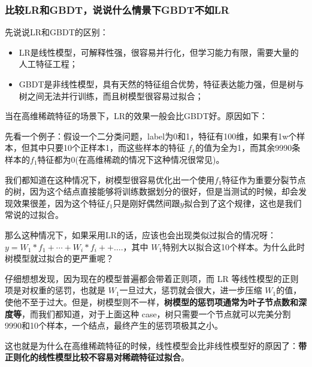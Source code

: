 \documentclass[12pt]{article}
\begin{document}
\subsubsection{比较LR和GBDT，说说什么情景下GBDT不如LR}
先说说LR和GBDT的区别：
\begin{itemize}
\setlength{\itemsep}{0pt}
\setlength{\parsep}{0pt}
\setlength{\parskip}{0pt}
    \item LR是线性模型，可解释性强，很容易并行化，但学习能力有限，需要大量的人工特征工程；
    \item GBDT是非线性模型，具有天然的特征组合优势，特征表达能力强，但是树与树之间无法并行训练，而且树模型很容易过拟合；
\end{itemize}

当在高维稀疏特征的场景下，LR的效果一般会比GBDT好。原因如下：

先看一个例子：假设一个二分类问题，label为0和1，特征有100维，如果有1w个样本，但其中只要10个正样本1，而这些样本的特征 $f_1$的值为全为1，而其余9990条样本的$f_1$特征都为0(在高维稀疏的情况下这种情况很常见)。

我们都知道在这种情况下，树模型很容易优化出一个使用$f_1$特征作为重要分裂节点的树，因为这个结点直接能够将训练数据划分的很好，但是当测试的时候，却会发现效果很差，因为这个特征$f_1$只是刚好偶然间跟$y$拟合到了这个规律，这也是我们常说的过拟合。

那么这种情况下，如果采用LR的话，应该也会出现类似过拟合的情况呀：$y = W_1*f_1 + \cdots + W_i*f_i + + ….$，其中 $W_1$特别大以拟合这10个样本。为什么此时树模型就过拟合的更严重呢？

仔细想想发现，因为现在的模型普遍都会带着正则项，而 LR 等线性模型的正则项是对权重的惩罚，也就是 $W_1$一旦过大，惩罚就会很大，进一步压缩 $W_1 $的值，使他不至于过大。但是，树模型则不一样，\textbf{树模型的惩罚项通常为叶子节点数和深度等}，而我们都知道，对于上面这种 case，树只需要一个节点就可以完美分割9990和10个样本，一个结点，最终产生的惩罚项极其之小。

这也就是为什么在高维稀疏特征的时候，线性模型会比非线性模型好的原因了：\textbf{带正则化的线性模型比较不容易对稀疏特征过拟合}。
\end{document}
